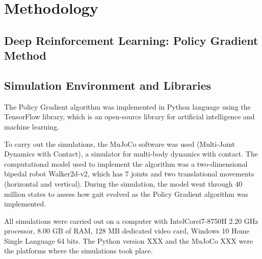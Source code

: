 \section{Methodology}

\subsection{Deep Reinforcement Learning: Policy Gradient Method}

\subsection{Simulation Environment and Libraries}

The Policy Gradient algorithm was implemented in Python language using the TensorFlow library, which is an open-source library for artificial intelligence and machine learning.

To carry out the simulations, the MuJoCo software was used (Multi-Joint Dynamics with Contact), a simulator for multi-body dynamics with contact. The computational model used to implement the algorithm was a two-dimensional bipedal robot Walker2d-v2, which has 7 joints and two translational movements (horizontal and vertical). During the simulation, the model went through 40 million states to assess how gait evolved as the Policy Gradient algorithm was implemented.

All simulations were carried out on a computer with Intel\textregistered Core\texttrademark i7-8750H 2.20 GHz processor, 8.00 GB of RAM, 128 MB dedicated video card, Windows 10 Home Single Language 64 bits. The Python version XXX and the MuJoCo XXX were the platforms where the simulations took place.